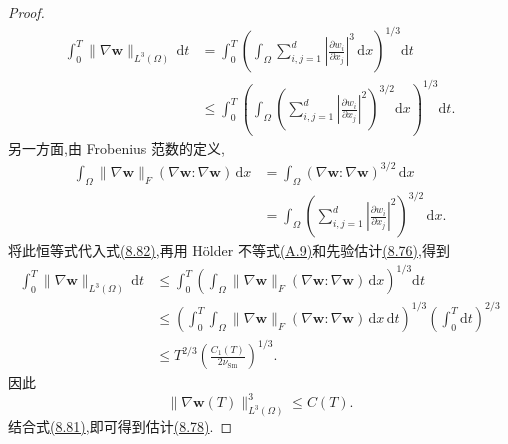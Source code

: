 \begin{proof}
\begin{equation}
\begin{aligned}
 \int_0^T\|\nabla\bm{w}\|_{L^3(\Omega)}\,\mathrm{d}t
 &=\int_0^T
   \left(\int_\Omega\sum_{i,j=1}^{d}
       \left|\frac{\partial w_i}{\partial x_j}\right|^3
                       \,\mathrm{d}x\right)^{1/3}\mathrm{d}t\\
 &\le\int_0^T
   \left(\int_\Omega
      \left(\sum_{i,j=1}^{d}
       \left|\frac{\partial w_i}{\partial x_j}\right|^2
      \right)^{3/2}\mathrm{d}x\right)^{1/3}\mathrm{d}t.
\end{aligned}
\end{equation}
另一方面,由 Frobenius 范数的定义,
\[
\begin{aligned}
 \int_\Omega\|\nabla\bm{w}\|_F
       (\nabla\bm{w}:\nabla\bm{w})\,\mathrm{d}x
 &=\int_\Omega(\nabla\bm{w}:\nabla\bm{w})^{3/2}\,\mathrm{d}x\\
 &=\int_\Omega
   \left(\sum_{i,j=1}^{d}
       \left|\frac{\partial w_i}{\partial x_j}\right|^2
   \right)^{3/2}\,\mathrm{d}x.
\end{aligned}
\]
将此恒等式代入式\hyperref[eq:smagorinsky-gradient-time-integral]{(8.82)},再用 Hölder 不等式\hyperref[eq:appendix-a-9]{(A.9)}和先验估计\hyperref[eq:smagorinsky-energy-estimate]{(8.76)},得到
\[
\begin{aligned}
 \int_0^T\|\nabla\bm{w}\|_{L^3(\Omega)}\,\mathrm{d}t
 &\le \int_0^T
   \left(\int_\Omega
       \|\nabla\bm{w}\|_F
       (\nabla\bm{w}:\nabla\bm{w})\,\mathrm{d}x
   \right)^{1/3}\mathrm{d}t\\
 &\le
  \left(\int_0^T\int_\Omega
       \|\nabla\bm{w}\|_F
       (\nabla\bm{w}:\nabla\bm{w})\,\mathrm{d}x\,\mathrm{d}t
  \right)^{1/3}
  \left(\int_0^T\mathrm{d}t\right)^{2/3}\\
 &\le T^{2/3}
       \left(\frac{C_1(T)}{2\nu_{\mathrm{Sm}}}\right)^{1/3}.
\end{aligned}
\]
因此
\[
 \|\nabla\bm{w}(T)\|_{L^3(\Omega)}^3\le C(T).
\]
结合式\hyperref[eq:smagorinsky-h1-intermediate-estimate]{(8.81)},即可得到估计\hyperref[eq:smagorinsky-h1-stability]{(8.78)}.
\end{proof}
